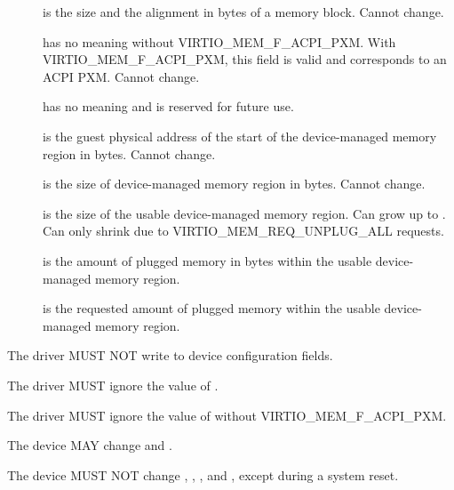 \begin{description}
\item[] is the size and the alignment in bytes of a
memory block.  Cannot change.
\item[] has no meaning without VIRTIO_MEM_F_ACPI_PXM.  With
VIRTIO_MEM_F_ACPI_PXM, this field is valid and corresponds to an ACPI PXM.
Cannot change.
\item[] has no meaning and is reserved for future use.
\item[] is the guest physical address of the start of the
device-managed memory region in bytes.  Cannot change.
\item[] is the size of device-managed memory region in
bytes.  Cannot change.
\item[] is the size of the usable device-managed
memory region.  Can grow up to .  Can only shrink due to
VIRTIO_MEM_REQ_UNPLUG_ALL requests.
\item[] is the amount of plugged memory in bytes within
the usable device-managed memory region.
\item[] is the requested amount of plugged memory
within the usable device-managed memory region.
\end{description}


The driver MUST NOT write to device configuration fields.

The driver MUST ignore the value of .

The driver MUST ignore the value of  without
VIRTIO_MEM_F_ACPI_PXM.


The device MAY change  and
.

The device MUST NOT change , ,
, and , except during a system reset.


